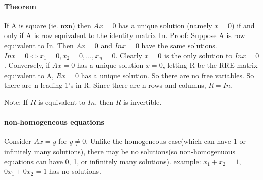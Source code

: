 \documentclass{article}
\begin{document}
\paragraph{Theorem}
If A is square (ie. nxn) then $Ax=0$ has a unique solution (namely $x=0$) if and only if A is row equivalent to the identity matrix In. Proof: Suppose A is row equivalent to In. Then $Ax=0$ and $Inx=0$ have the same solutions. $Inx=0\Leftrightarrow x_1=0, x_2=0, \ldots, x_n=0$. Clearly $x=0$ is the only solution to $Inx=0$. Conversely, if $Ax=0$ has a unique solution $x=0$, letting R be the RRE matrix equivalent to A, $Rx=0$ has a unique solution. So there are no free variables. So there are n leading 1's in R. Since there are n rows and columns, $R=In$. 

Note: If $R$ is equivalent to $In$, then $R$ is invertible. 

\paragraph{non-homogeneous equations}
Consider $Ax=y$ for $y\neq0$. Unlike the homogeneous case(which can have 1 or infinitely many solutions), there may be no solutions(so non-homogenuous equations can have 0, 1, or infinitely many solutions). example: $x_1+x_2=1$, $0x_1+0x_2=1$ has no solutions. 
\end{document}
